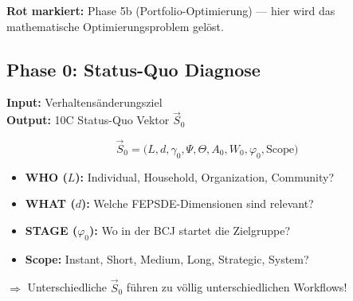 \begin{tcolorbox}[colback=blue!5!white, colframe=blue!75!black,
    title=\textbf{Die 9 Phasen des Interventions-Designs (inkl.\ Optimierung)}]
\begin{center}
\end{center}

\textbf{Rot markiert:} Phase 5b (Portfolio-Optimierung) --- hier wird das mathematische Optimierungsproblem gelöst.

\end{tcolorbox}

\subsection{Phase 0: Status-Quo Diagnose}
\label{sec:20-phase0}

\textbf{Input:} Verhaltensänderungsziel\\
\textbf{Output:} 10C Status-Quo Vektor $\vec{S}_0$

\begin{equation}
\vec{S}_0 = \bigl(L, d, \gamma_0, \Psi, \Theta, A_0, W_0, \varphi_0, \text{Scope}\bigr)
\end{equation}

\begin{tcolorbox}[colback=orange!5!white, colframe=orange!75!black,
    title=\textbf{Variabilität in Phase 0}]
\begin{itemize}[nosep]
\item \textbf{WHO ($L$):} Individual, Household, Organization, Community?
\item \textbf{WHAT ($d$):} Welche FEPSDE-Dimensionen sind relevant?
\item \textbf{STAGE ($\varphi_0$):} Wo in der BCJ startet die Zielgruppe?
\item \textbf{Scope:} Instant, Short, Medium, Long, Strategic, System?
\end{itemize}
$\Rightarrow$ Unterschiedliche $\vec{S}_0$ führen zu völlig unterschiedlichen Workflows!
\end{tcolorbox}


